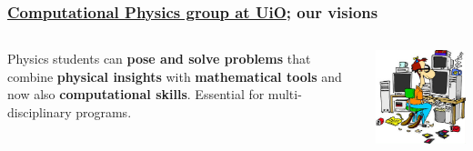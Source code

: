 \documentclass{beamer}
\begin{document}
\begin{frame}
\frametitle{\href{{http://www.mn.uio.no/fysikk/english/research/groups/computational/index.html}}{Computational Physics group at UiO}; our visions}

\begin{columns}
\begin{block}{}
Physics students can \textbf{pose and solve problems} that combine \textbf{physical insights} with \textbf{mathematical tools} and now also \textbf{computational skills}.
Essential for multi-disciplinary programs.
\end{block}

\centerline{\includegraphics[width=1.0\linewidth]{fig-future/computer_nerd2.jpg}}



\end{columns}
\end{frame}
\end{document}
